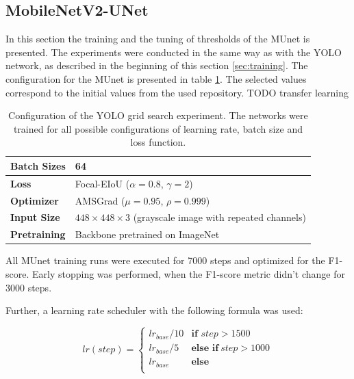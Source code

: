 \subsection{MobileNetV2-UNet}

In this section the training and the tuning of thresholds of the \ac{MUnet} is presented.
The experiments were conducted in the same way as with the YOLO network, as described in the beginning of this section \ref{sec:training}.
The configuration for the \ac{MUnet} is presented in table \ref{tab:munet_config}.
The selected values correspond to the initial values from the used repository.
TODO transfer learning

\begin{table}[H]
\footnotesize
\begin{center}
\begin{tabular}{|l|l|}

\hline
\textbf{Batch Sizes} & 64\\
\hline
\textbf{Loss} & Focal-EIoU ($\alpha = 0.8$, $\gamma = 2$) \\
\hline
\textbf{Optimizer} & AMSGrad ($\mu = 0.95$, $\rho = 0.999$) \\
\hline
\textbf{Input Size} & $448 \times 448 \times 3$ (grayscale image with repeated channels) \\
\hline
\textbf{Pretraining} & Backbone pretrained on ImageNet \\
\hline

\end{tabular}
\caption{Configuration of the YOLO grid search experiment. The networks were trained for all possible configurations of learning rate, batch size and loss function.}
\label{tab:munet_config}
\end{center}
\end{table}

All \ac{MUnet} training runs were executed for 7000 steps and optimized for the F1-score.
Early stopping was performed, when the F1-score metric didn't change for 3000 steps.

Further, a learning rate scheduler with the following formula was used:

\begin{equation}
    lr(step) =
    \begin{cases}
        lr_{base} / 10 & \textbf{if } step > 1500 \\
        lr_{base} / 5  & \textbf{else if}\ step > 1000 \\
        lr_{base}      & \textbf{else} \\
    \end{cases}
\end{equation}

